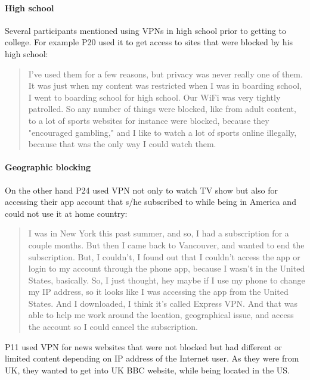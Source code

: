 \paragraph{High school} Several participants mentioned using VPNs in high school prior to getting to college. For example P20 used it to get access to sites that were
blocked by his high school: 
\begin{quote}I've used them for a few reasons,
    but privacy was never really one of them. It was just when my content was
    restricted when I was in boarding school, I went to boarding
    school for high school. Our WiFi was very tightly patrolled. So any number
    of things were blocked, like from adult content, to a lot of sports
    websites for instance were blocked, because they "encouraged gambling,"
    and I like to watch a lot of sports online illegally, because that was the
    only way I could watch them.\end{quote}

\paragraph{Geographic blocking} On the other hand P24 used VPN not only to watch
TV show but also for accessing their app account that s/he subscribed to while
being in America and could not use it at home country: \begin{quote}I was in
New York this past summer, and so, I had a subscription for a couple months.
But then I came back to Vancouver, and wanted to end the subscription. But, I
couldn't, I found out that I couldn't access the app or login to my account
through the phone app, because I wasn't in the United States, basically. So, I
just thought, hey maybe if I use my phone to change my IP address, so it
looks like I was accessing the app from the United States. And I downloaded, I
think it's called Express VPN. And that was able to help me work around the
location, geographical issue, and access the account so I could cancel the
subscription.\end{quote}


P11 used VPN for news websites that were not blocked but had different or
limited content depending on IP address of the Internet user. As they were
from UK, they wanted to get into UK BBC website, while being located in the
US.

